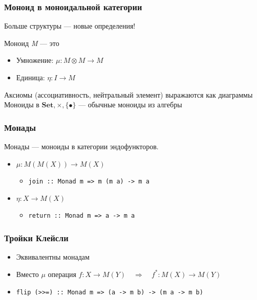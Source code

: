 \documentclass{beamer}
\begin{document}
\begin{frame}
\frametitle{Моноид в моноидальной категории}
Больше структуры --- новые определения!
\begin{block}{Моноид \textit{M} --- это}
\begin{itemize}
\item Умножение: \begin{math}\mu: M\otimes M\rightarrow M\end{math}
\item Единица: \begin{math}\eta: I \rightarrow M\end{math}
\end{itemize}
\end{block}
Аксиомы (ассоциативность, нейтральный элемент) выражаются как диаграммы
\newline
Моноиды в \begin{math}\mathbf{Set}, \times, \{\bullet\}\end{math} --- обычные моноиды из алгебры
\end{frame}

\begin{frame}
\frametitle{Монады}
Монады --- моноиды в категории эндофункторов.
\begin{itemize}
\item \begin{math}\mu:M(M(X)) \rightarrow M(X)\end{math}
\begin{itemize}
\item \texttt{join :: Monad m => m (m a) -> m a}
\end{itemize}
\item \begin{math}\eta:X \rightarrow M(X)\end{math}
\begin{itemize}
\item \texttt{return :: Monad m => a -> m a}
\end{itemize}
\end{itemize}
\end{frame}

\begin{frame}
\frametitle{Тройки Клейсли}
\begin{itemize}
\item Эквивалентны монадам
\item Вместо \begin{math}\mu\end{math} операция \begin{math}f: X \rightarrow M(Y) \quad \Longrightarrow \quad f^*:M(X) \rightarrow M(Y)\end{math}
\item \texttt{flip (>{}>=) :: Monad m => (a -> m b) -> (m a -> m b)}
\end{itemize}
\end{frame}
\end{document}
